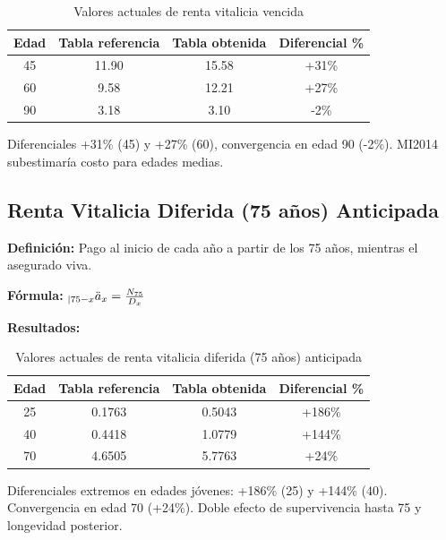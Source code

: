 \begin{table}[H]
\centering
\caption{Valores actuales de renta vitalicia vencida}
\label{tab:renta_vitalicia_vencida}
\begin{tabular}{cccc}
\toprule
\tableheadercolor
\textbf{Edad} & \textbf{Tabla referencia} & \textbf{Tabla obtenida} & \textbf{Diferencial \%} \\
\midrule
45 & 11.90 & 15.58 & +31\% \\
60 & 9.58 & 12.21 & +27\% \\
90 & 3.18 & 3.10 & -2\% \\
\bottomrule
\end{tabular}
\end{table}

Diferenciales +31\% (45) y +27\% (60), convergencia en edad 90 (-2\%). MI2014 subestimaría costo para edades medias.

\clearpage

\subsection{Renta Vitalicia Diferida (75 años) Anticipada}

\textbf{Definición:} Pago al inicio de cada año a partir de los 75 años, mientras el asegurado viva.

\textbf{Fórmula:} ${}_{|75-x}\ddot{a}_x = \frac{N_{75}}{D_{x}}$

\textbf{Resultados:}

\begin{table}[H]
\centering
\caption{Valores actuales de renta vitalicia diferida (75 años) anticipada}
\label{tab:renta_diferida_75}
\begin{tabular}{cccc}
\toprule
\tableheadercolor
\textbf{Edad} & \textbf{Tabla referencia} & \textbf{Tabla obtenida} & \textbf{Diferencial \%} \\
\midrule
25 & 0.1763 & 0.5043 & +186\% \\
40 & 0.4418 & 1.0779 & +144\% \\
70 & 4.6505 & 5.7763 & +24\% \\
\bottomrule
\end{tabular}
\end{table}

Diferenciales extremos en edades jóvenes: +186\% (25) y +144\% (40). Convergencia en edad 70 (+24\%). Doble efecto de supervivencia hasta 75 y longevidad posterior.

